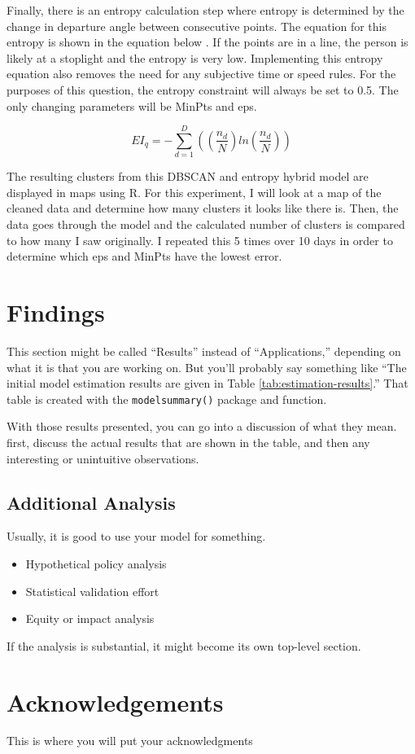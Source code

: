 \documentclass[3p, authoryear]{elsarticle} %
\providecommand{\tightlist}{%
  \setlength{\itemsep}{0pt}\setlength{\parskip}{0pt}}
\begin{document}
Finally, there is an entropy calculation step where entropy is determined by the change in departure angle between consecutive points. The equation for this entropy is shown in the equation below \citep{GongInspiration}. If the points are in a line, the person is likely at a stoplight and the entropy is very low. Implementing this entropy equation also removes the need for any subjective time or speed rules. For the purposes of this question, the entropy constraint will always be set to 0.5. The only changing parameters will be MinPts and eps.

\begin{equation}
  EI_q = -\sum_{d=1}^D ((\frac{n_d}{N})ln(\frac{n_d}{N}))
\end{equation}

The resulting clusters from this DBSCAN and entropy hybrid model are displayed in maps using R. For this experiment, I will look at a map of the cleaned data and determine how many clusters it looks like there is. Then, the data goes through the model and the calculated number of clusters is compared to how many I saw originally. I repeated this 5 times over 10 days in order to determine which eps and MinPts have the lowest error.

\hypertarget{findings}{%
\section{Findings}\label{findings}}

This section might be called ``Results'' instead of ``Applications,'' depending
on what it is that you are working on. But you'll probably say something like
``The initial model estimation results are given in Table \ref{tab:estimation-results}.''
That table is created with the \texttt{modelsummary()} package and function.

With those results presented, you can go into a discussion of what they mean.
first, discuss the actual results that are shown in the table, and then any
interesting or unintuitive observations.

\hypertarget{additional-analysis}{%
\subsection{Additional Analysis}\label{additional-analysis}}

Usually, it is good to use your model for something.

\begin{itemize}
\tightlist
\item
  Hypothetical policy analysis
\item
  Statistical validation effort
\item
  Equity or impact analysis
\end{itemize}

If the analysis is substantial, it might become its own top-level section.

\hypertarget{acknowledgements}{%
\section*{Acknowledgements}\label{acknowledgements}}

This is where you will put your acknowledgments


\end{document}
